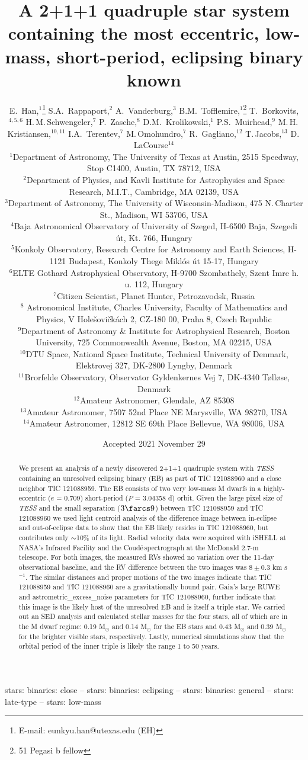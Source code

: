 \documentclass[fleqn,usenatbib]{mnras} %
\title{A 2+1+1 quadruple star system containing the most eccentric, low-mass, short-period, eclipsing binary known}
\author[E. Han et al.]{
E.~Han,$^{1}$\thanks{E-mail: eunkyu.han@utexas.edu (EH)}
S.A.~Rappaport,$^{2}$
A.~Vanderburg,$^{3}$
B.M.~Tofflemire,$^{1}$\thanks{51 Pegasi b fellow}
T.~Borkovits,$^{4,5,6}$
H.\,M.\,Schwengeler,$^{7}$
\newauthor
P.~Zasche,$^{8}$
D.M.~Krolikowski,$^{1}$
P.S.~Muirhead,$^{9}$
M.\,H.\,Kristiansen,$^{10,11}$
I.A.~Terentev,$^{7}$
M.\,Omohundro,$^{7}$
\newauthor
R.~Gagliano,$^{12}$
T.\,Jacobs,$^{13}$
D.\,LaCourse$^{14}$
\\
$^{1}$Department of Astronomy, The University of Texas at Austin, 2515 Speedway, Stop C1400, Austin, TX 78712, USA\\
$^{2}$Department of Physics, and Kavli Institute for Astrophysics and Space Research, M.I.T., Cambridge, MA 02139, USA\\
$^{3}$Department of Astronomy, The University of Wisconsin-Madison, 475 N.\,Charter St., Madison, WI 53706, USA \\
$^{4}$Baja Astronomical Observatory of University of Szeged, H-6500 Baja, Szegedi \'ut, Kt. 766, Hungary\\
$^{5}$Konkoly Observatory, Research Centre for Astronomy and Earth Sciences,  H-1121 Budapest, Konkoly Thege Mikl\'os \'ut 15-17, Hungary\\
$^{6}$ELTE Gothard Astrophysical Observatory, H-9700 Szombathely, Szent Imre h. u. 112, Hungary \\
$^{7}$Citizen Scientist, Planet Hunter, Petrozavodsk, Russia \\
$^{8}$ Astronomical Institute, Charles University, Faculty of Mathematics and Physics, V Hole\v{s}ovi\v{c}k\'{a}ch 2, CZ-180 00, Praha 8, Czech Republic \\
$^{9}$Department of Astronomy \& Institute for Astrophysical Research, Boston University, 725 Commonwealth Avenue, Boston, MA 02215, USA\\
$^{10}$DTU Space, National Space Institute, Technical University of Denmark, Elektrovej 327, DK-2800 Lyngby, Denmark \\
$^{11}$Brorfelde Observatory, Observator Gyldenkernes Vej 7, DK-4340 T\o ll\o se, Denmark \\
$^{12}$Amateur Astronomer, Glendale, AZ 85308 \\
$^{13}$Amateur Astronomer, 7507 52nd Place NE Marysville, WA 98270, USA \\
$^{14}$Amateur Astronomer, 12812 SE 69th Place Bellevue, WA 98006, USA \\
}
\date{Accepted 2021 November 29}
\newcommand{\coude}{Coud{\'e}}
\begin{document}
\label{firstpage}
\pagerange{\pageref{firstpage}--\pageref{lastpage}}
\maketitle

\begin{abstract}
We present an analysis of a newly discovered 2+1+1 quadruple system with {\em TESS} containing an unresolved eclipsing binary (EB) as part of TIC 121088960 and a close neighbor TIC 121088959. The EB consists of two very low-mass M dwarfs in a highly-eccentric ($e$ = 0.709) short-period ($P$ = 3.04358 d) orbit. Given the large pixel size of {\em TESS} and the small separation ($3\farcs9$) between TIC 121088959 and TIC 121088960 we used light centroid analysis of the difference image between in-eclipse and out-of-eclipse data to show that the EB likely resides in TIC 121088960, but contributes only $\sim$10\% of its light.  Radial velocity data were acquired with iSHELL at NASA's Infrared Facility and the \coude \,spectrograph at the McDonald 2.7-m telescope. For both images, the measured RVs showed no variation over the 11-day observational baseline, and the RV difference between the two images was $8 \pm 0.3$ km s$^{-1}$. The similar distances and proper motions of the two images indicate that TIC 121088959 and TIC 121088960 are a gravitationally bound pair.  Gaia's large RUWE and astrometric\_excess\_noise parameters for TIC 121088960, further indicate that this image is the likely host of the unresolved EB and is itself a triple star. We carried out an SED analysis and calculated stellar masses for the four stars, all of which are in the M dwarf regime: 0.19 M$_\odot$ and 0.14 M$_\odot$ for the EB stars and 0.43 M$_\odot$ and 0.39 M$_\odot$ for the brighter visible stars, respectively. Lastly, numerical simulations show that the orbital period of the inner triple is likely the range 1 to 50 years.
  \end{abstract}

\begin{keywords}
stars: binaries: close -- stars: binaries: eclipsing -- stars: binaries: general -- stars: late-type -- stars: low-mass
\end{keywords}


\end{document}
